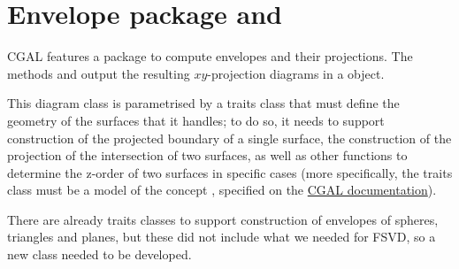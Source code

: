 \documentclass[11pt,a4paper,english]{article}
\begin{document}

	\section{Envelope package and }
	CGAL features a package to compute envelopes and their projections. The methods  and  output the resulting \(xy\)-projection diagrams in a  object.\par
	This diagram class is parametrised by a traits class that must define the geometry of the surfaces that it handles; to do so, it needs to support construction of the projected boundary of a single surface, the construction of the projection of the intersection of two surfaces, as well as other functions to determine the z-order of two surfaces in specific cases (more specifically, the traits class must be a model of the concept , specified on the \href{https://doc.cgal.org/4.9.1/Envelope_3/classEnvelopeTraits__3.html}{CGAL documentation}).\par
	There are already traits classes to support construction of envelopes of spheres, triangles and planes, but these did not include what we needed for FSVD, so a new class needed to be developed.
	
\end{document}
